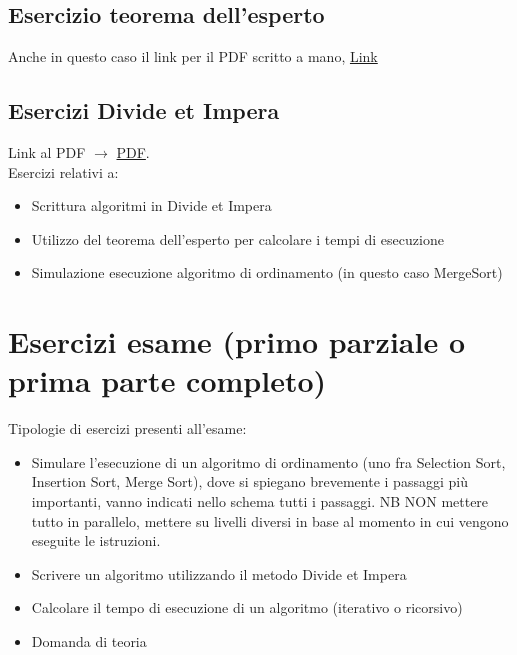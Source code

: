 \subsection{Esercizio teorema dell'esperto}
Anche in questo caso il link per il PDF scritto a mano,
\href{https://drive.google.com/file/d/1aDfCN6H7dskDnQHP-jPJcsS9lYL16XWT/view?usp=sharing}{Link}
\subsection{Esercizi Divide et Impera}
Link al PDF $\rightarrow$
\href{https://drive.google.com/file/d/1uE9Qx0KQFS79spWmqmrkDph0iVdfbZnz/view?usp=sharing}{PDF}.\\
Esercizi relativi a:
\begin{itemize}
    \item Scrittura algoritmi in Divide et Impera
    \item Utilizzo del teorema dell'esperto per calcolare i tempi di esecuzione
    \item Simulazione esecuzione algoritmo di ordinamento (in questo caso MergeSort)
\end{itemize}
\section{Esercizi esame (primo parziale o prima parte completo)}
Tipologie di esercizi presenti all'esame:
\begin{itemize}
    \item Simulare l'esecuzione di un algoritmo di ordinamento (uno fra Selection Sort, 
    Insertion Sort, Merge Sort), dove si spiegano brevemente i passaggi più importanti,
    vanno indicati nello schema tutti i passaggi. NB NON mettere tutto in parallelo, mettere su livelli
    diversi in base al momento in cui vengono eseguite le istruzioni.
    \item Scrivere un algoritmo utilizzando il metodo Divide et Impera
    \item Calcolare il tempo di esecuzione di un algoritmo (iterativo o ricorsivo)
    \item Domanda di teoria
\end{itemize}
